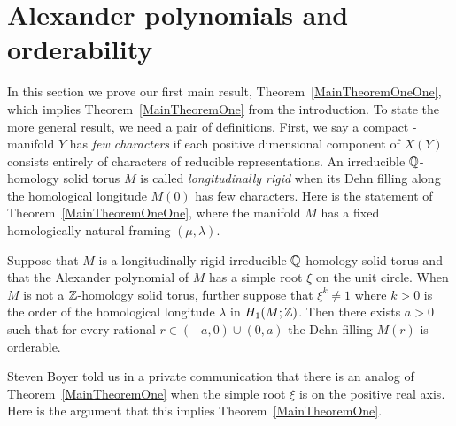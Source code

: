 \documentclass[tikz, sepfignums, defaultenums]{nmd/article}
\begin{document}
\section{Alexander polynomials and orderability}
\label{sec:alexordering}

In this section we prove our first main result,
Theorem~\ref{MainTheoremOneOne}, which implies
Theorem~\ref{MainTheoremOne} from the introduction.  To state the more
general result, we need a pair of definitions.  First, we say a
compact \3-manifold $Y$ has \emph{few characters} if each positive
dimensional component of $X(Y)$ consists entirely of characters of
reducible representations.  An irreducible ${\mathbb Q}$-homology solid torus
$M$ is called \emph{longitudinally rigid} when its Dehn filling along
the homological longitude $M(0)$ has few characters.  Here is the
statement of Theorem~\ref{MainTheoremOneOne}, where the manifold $M$
has a fixed homologically natural framing $(\mu, \lambda)$.

\begin{theorem}
  \label{MainTheoremOneOne}
  Suppose that $M$ is a longitudinally rigid irreducible ${\mathbb Q}$-homology
  solid torus and that the Alexander polynomial of $M$ has a simple root
  $\xi$ on the unit circle.  When $M$ is not a ${\mathbb Z}$-homology solid torus,
  further suppose that $\xi^k \neq 1$ where $k > 0$ is the order of
  the homological longitude $\lambda$ in $H_1(M; {\mathbb Z})$.  Then there
  exists $a>0$ such that for every rational $r\in (-a,0) \cup (0, a)$
  the Dehn filling $M(r)$ is orderable.
\end{theorem}
Steven Boyer told us in a private communication that there is an
analog of Theorem~\ref{MainTheoremOne} when the simple root $\xi$ is
on the positive real axis.  Here is the argument that this
implies Theorem~\ref{MainTheoremOne}.
\end{document}
